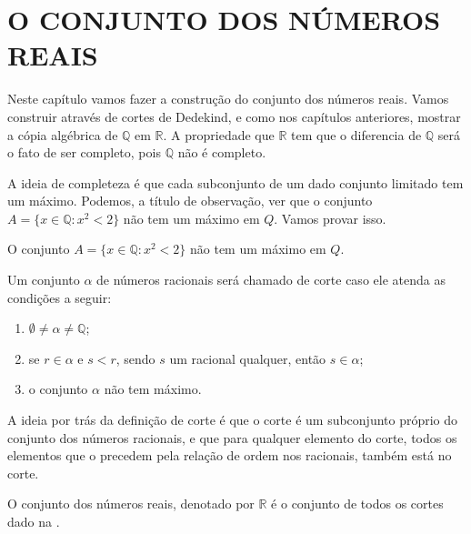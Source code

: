 \documentclass[../main.tex]{subfiles}
\begin{document}
\chapter{O CONJUNTO DOS NÚMEROS REAIS}\label{cap-reais}


Neste capítulo vamos fazer a construção do conjunto dos números reais. Vamos construir através de cortes de Dedekind, e como nos capítulos anteriores, mostrar a cópia algébrica de $\mathbb{Q}$ em $\mathbb{R}$. A propriedade que $\mathbb{R}$ tem que o diferencia de $\mathbb{Q}$ será o fato de ser completo, pois $\mathbb{Q}$ não é completo.

A ideia de completeza é que cada subconjunto de um dado conjunto limitado tem um máximo. Podemos, a título de observação, ver que o conjunto 
$A = \{ x \in \mathbb{Q} : x^2 < 2\}$ não tem um máximo em $Q$. Vamos provar isso.
\begin{prop}
    O conjunto $A = \{ x \in \mathbb{Q} : x^2 < 2\}$ não tem um máximo em $Q$.
\end{prop}
\begin{dem}
\end{dem}

\begin{defi}\label{reais-def-corte}
    Um conjunto $\alpha$ de números racionais será chamado de corte caso ele atenda as condições a seguir:
    \begin{enumerate}[label=(\roman*)]
        \item\label{reais-corte-subconjProprio} $\emptyset \neq \alpha \neq \mathbb{Q}$;
        \item\label{reais-corte-precede} se $r \in \alpha$ e $s < r$, sendo $s$ um racional qualquer, então $s \in \alpha$;
        \item\label{reais-corte-semMaximo} o conjunto $\alpha$ não tem máximo.
    \end{enumerate}
\end{defi}

A ideia por trás da definição de corte é que o corte é um subconjunto próprio do conjunto dos números racionais, e que para qualquer elemento do corte, todos os elementos que o precedem pela relação de ordem nos racionais, também está no corte.

\begin{defi}
    O conjunto dos números reais, denotado por $\mathbb{R}$ é o conjunto de todos os cortes dado na .
\end{defi}
\end{document}
